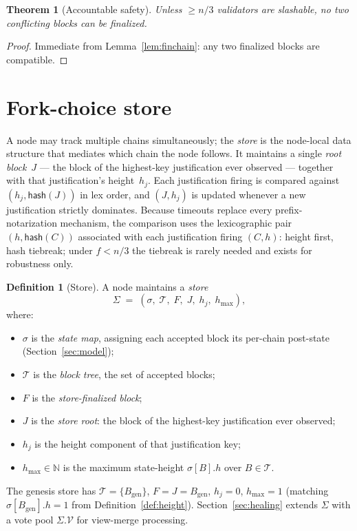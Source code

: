 \documentclass{article}
\newcommand{\genesis}{\ensuremath{B_{\mathrm{gen}}}}
\newcommand{\T}[0]{\ensuremath{\mathcal{T}}}
\newcommand{\hash}{\mathsf{hash}}
\newcommand{\hmax}{\ensuremath{h_{\max}}\xspace}
\theoremstyle{plain}
\newtheorem{theorem}{Theorem}
\theoremstyle{definition}
\newtheorem{definition}{Definition}
\theoremstyle{remark}
\begin{document}
\begin{theorem}[Accountable safety]\label{thm:safety}
Unless $\geq n/3$ validators are slashable, no two conflicting blocks can be finalized.
\end{theorem}

\begin{proof}
Immediate from Lemma~\ref{lem:finchain}: any two finalized blocks are compatible.
\end{proof}
\section{Fork-choice store}\label{sec:store}

A node may track multiple chains simultaneously; the \emph{store} is the node-local data structure that mediates which chain the node follows.
It maintains a single \emph{root block}~$J$ --- the block of the highest-key justification ever observed --- together with that justification's height~$h_j$.
Each justification firing is compared against $(h_j, \hash(J))$ in lex order, and $(J, h_j)$ is updated whenever a new justification strictly dominates.
Because timeouts replace every prefix-notarization mechanism, the comparison uses the lexicographic pair $(h, \hash(C))$ associated with each justification firing $(C, h)$: height first, hash tiebreak; under $f < n/3$ the tiebreak is rarely needed and exists for robustness only.

\begin{definition}[Store]\label{def:store}
A node maintains a \emph{store}
\[
  \Sigma \;=\; (\sigma,\; \T,\; F,\; J,\; h_j,\; \hmax),
\]
where:
\begin{itemize}
  \item $\sigma$ is the \emph{state map}, assigning each accepted block its per-chain post-state (Section~\ref{sec:model});
  \item $\T$ is the \emph{block tree}, the set of accepted blocks;
  \item $F$ is the \emph{store-finalized block};
  \item $J$ is the \emph{store root}: the block of the highest-key justification ever observed;
  \item $h_j$ is the height component of that justification key;
  \item $\hmax \in \mathbb{N}$ is the maximum state-height $\sigma[B].h$ over $B \in \T$.
\end{itemize}
The genesis store has $\T = \{\genesis\}$, $F = J = \genesis$, $h_j = 0$, $\hmax = 1$ (matching $\sigma[\genesis].h = 1$ from Definition~\ref{def:height}).
Section~\ref{sec:healing} extends $\Sigma$ with a vote pool $\Sigma.\mathcal{V}$ for view-merge processing.
\end{definition}
\end{document}
